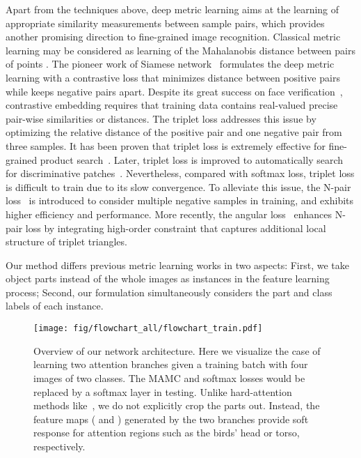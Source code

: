 \documentclass[runningheads]{llncs}
\begin{document}
Apart from the techniques above, deep metric learning aims at the learning of appropriate similarity measurements between sample pairs, which provides another promising direction to fine-grained image recognition.
Classical metric learning may be considered as learning of the Mahalanobis distance between pairs of points \cite{kulis2013metric}.
The pioneer work of Siamese network~\cite{bromley1994signature} formulates the deep metric learning with a contrastive loss that minimizes distance between positive pairs while keeps negative pairs apart.
Despite its great success on face verification~\cite{SchroffKP15}, contrastive embedding requires that training data contains real-valued precise pair-wise similarities or distances.
The triplet loss \cite{salakhutdinov2007learning} addresses this issue by optimizing the relative distance of the positive pair and one negative pair from three samples.
It has been proven that triplet loss is extremely effective for fine-grained product search~\cite{WangSLRWPCW14}.
Later, triplet loss is improved to automatically search for discriminative patches~\cite{wang2016mining}.
Nevertheless, compared with softmax loss, triplet loss is difficult to train due to its slow convergence.
To alleviate this issue, the N-pair loss~\cite{sohn2016improved} is introduced to consider multiple negative samples in training, and exhibits higher efficiency and performance.
More recently, the angular loss~\cite{wang2017deep} enhances N-pair loss by integrating high-order constraint that captures additional local structure of triplet triangles.

Our method differs previous metric learning works in two aspects:
First, we take object parts instead of the whole images as instances in the feature learning process;
Second, our formulation simultaneously considers the part and class labels of each instance.

\begin{figure*}[t]
  \centering
  \texttt{[image: fig/flowchart\_all/flowchart\_train.pdf]}
  \caption{Overview of our network architecture.
    Here we visualize the case of learning two attention branches given a training batch with four images of two classes.
    The MAMC and softmax losses would be replaced by a softmax layer in testing.
    Unlike hard-attention methods like~\cite{fu2017look}, we do not explicitly crop the parts out.
    Instead, the feature maps ( and ) generated by the two branches provide soft response for attention regions such as the birds' head or torso, respectively.}
  \label{fig:flowchart_all}
\end{figure*}
\end{document}
